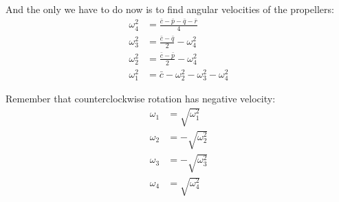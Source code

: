 \documentclass{article}
\begin{document}
    And the only we have to do now is to find angular velocities of the propellers:
    \begin{align*}
        \omega_4^2 &= \frac{\bar{c}-\bar{p}-\bar{q}-\bar{r}}{4} \\
        \omega_3^2 &= \frac{\bar{c}-\bar{q}}{2} - \omega_4^2 \\
        \omega_2^2 &= \frac{\bar{c}-\bar{p}}{2} - \omega_4^2 \\
        \omega_1^2 &= \bar{c} - \omega_2^2 - \omega_3^2 - \omega_4^2
    \end{align*}

    Remember that counterclockwise rotation has negative velocity:
    \begin{align*}
        \omega_1 &= \sqrt{\omega_1^2} \\
        \omega_2 &= -\sqrt{\omega_2^2} \\
        \omega_3 &= -\sqrt{\omega_3^2} \\
        \omega_4 &= \sqrt{\omega_4^2}
    \end{align*}
\end{document}
